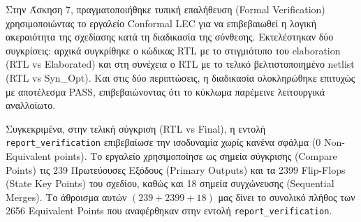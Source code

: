 Στην Άσκηση 7, πραγματοποιήθηκε τυπική επαλήθευση (Formal Verification) χρησιμοποιώντας το εργαλείο Conformal LEC για να επιβεβαιωθεί η λογική ακεραιότητα της σχεδίασης κατά τη διαδικασία της σύνθεσης. Εκτελέστηκαν δύο συγκρίσεις: αρχικά συγκρίθηκε ο κώδικας RTL με το στιγμιότυπο του elaboration (RTL vs Elaborated) και στη συνέχεια ο RTL με το τελικό βελτιστοποιημένο netlist (RTL vs Syn\_Opt). Και στις δύο περιπτώσεις, η διαδικασία ολοκληρώθηκε επιτυχώς με αποτέλεσμα PASS, επιβεβαιώνοντας ότι το κύκλωμα παρέμεινε λειτουργικά αναλλοίωτο.

Συγκεκριμένα, στην τελική σύγκριση (RTL vs Final), η εντολή \texttt{report\_verification} επιβεβαίωσε την ισοδυναμία χωρίς κανένα σφάλμα (0 Non-Equivalent points). Το εργαλείο χρησιμοποίησε ως σημεία σύγκρισης (Compare Points) τις 239 Πρωτεύουσες Εξόδους (Primary Outputs) και τα 2399 Flip-Flops (State Key Points) του σχεδίου, καθώς και 18 σημεία συγχώνευσης (Sequential Merges). Το άθροισμα αυτών $(239+2399+18)$ μας δίνει το συνολικό πλήθος των 2656 Equivalent Points που αναφέρθηκαν στην εντολή \texttt{report\_verification}.